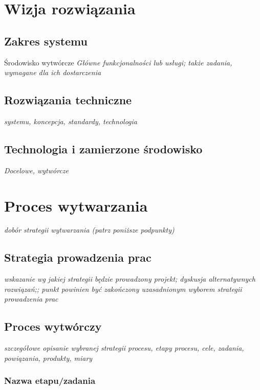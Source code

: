 \documentclass[11pt,oneside,a4paper,titlepage,onecolumn]{article}
\begin{document}
\section{Wizja rozwiązania}

\subsection{Zakres systemu}

Środowisko wytwórcze
\emph{Główne funkcjonalności lub usługi; także zadania, wymagane dla ich dostarczenia}

\subsection{Rozwiązania techniczne}

\emph{systemu, koncepcja, standardy, technologia}

\subsection{Technologia i zamierzone środowisko}

\emph{Docelowe, wytwórcze}

\section{Proces wytwarzania}

\emph{dobór strategii wytwarzania (patrz poniższe podpunkty)}

\subsection{Strategia prowadzenia prac}

\emph{wskazanie wg jakiej strategii będzie prowadzony projekt; dyskusja alternatywnych rozwiązań;; punkt powinien być zakończony uzasadnionym wyborem strategii prowadzenia prac}

\subsection{Proces wytwórczy}

\emph{szczegółowe opisanie wybranej strategii procesu, etapy procesu, cele, zadania, powiązania, produkty, miary}

\subsubsection{Nazwa etapu/zadania}
\end{document}
